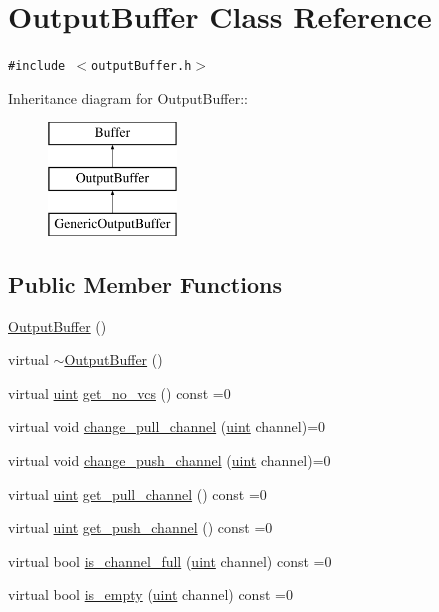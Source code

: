 \hypertarget{classOutputBuffer}{
\section{OutputBuffer Class Reference}
\label{classOutputBuffer}
}
{\tt \#include $<$outputBuffer.h$>$}

Inheritance diagram for OutputBuffer::\begin{figure}[H]
\begin{center}
\leavevmode
\includegraphics[height=3cm]{classOutputBuffer}
\end{center}
\end{figure}
\subsection*{Public Member Functions}
\begin{CompactItemize}
\item 
\hyperlink{classOutputBuffer_7a4352dc067a09bf7076bd7f8c6f6e1b}{OutputBuffer} ()
\item 
virtual \hyperlink{classOutputBuffer_928cc1b1e5cef13f3572c13775d547b5}{$\sim$OutputBuffer} ()
\item 
virtual \hyperlink{outputBuffer_8h_91ad9478d81a7aaf2593e8d9c3d06a14}{uint} \hyperlink{classOutputBuffer_21ad5222afd999f390df4a495eb48b0a}{get\_\-no\_\-vcs} () const =0
\item 
virtual void \hyperlink{classOutputBuffer_fb8e0a16f34dcff4c0d954201712f762}{change\_\-pull\_\-channel} (\hyperlink{outputBuffer_8h_91ad9478d81a7aaf2593e8d9c3d06a14}{uint} channel)=0
\item 
virtual void \hyperlink{classOutputBuffer_45a685173b5c5cbe6270c9e0ce6d023a}{change\_\-push\_\-channel} (\hyperlink{outputBuffer_8h_91ad9478d81a7aaf2593e8d9c3d06a14}{uint} channel)=0
\item 
virtual \hyperlink{outputBuffer_8h_91ad9478d81a7aaf2593e8d9c3d06a14}{uint} \hyperlink{classOutputBuffer_c4460c1a1ac34667c12cc77c57a393b9}{get\_\-pull\_\-channel} () const =0
\item 
virtual \hyperlink{outputBuffer_8h_91ad9478d81a7aaf2593e8d9c3d06a14}{uint} \hyperlink{classOutputBuffer_bafd65458146d9b383643fef94b38881}{get\_\-push\_\-channel} () const =0
\item 
virtual bool \hyperlink{classOutputBuffer_23aaeb2aa62e944596d50a569ed5d859}{is\_\-channel\_\-full} (\hyperlink{outputBuffer_8h_91ad9478d81a7aaf2593e8d9c3d06a14}{uint} channel) const =0
\item 
virtual bool \hyperlink{classOutputBuffer_7cba09e2dbb3794d873862b5066fd085}{is\_\-empty} (\hyperlink{outputBuffer_8h_91ad9478d81a7aaf2593e8d9c3d06a14}{uint} channel) const =0
\end{CompactItemize}


